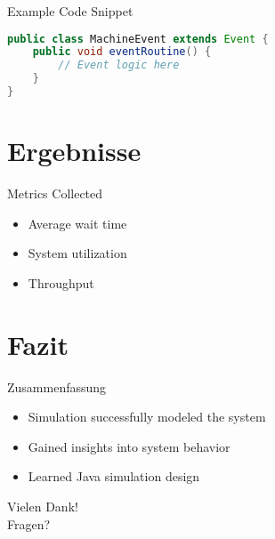\documentclass{beamer}
\begin{document}
    \begin{frame}[fragile]{Example Code Snippet}
        \begin{lstlisting}[language=Java, caption=Basic event class]
public class MachineEvent extends Event {
    public void eventRoutine() {
        // Event logic here
    }
}
        \end{lstlisting}
    \end{frame}

    \section{Ergebnisse}
    \begin{frame}{Metrics Collected}
        \begin{itemize}
            \item Average wait time
            \item System utilization
            \item Throughput
        \end{itemize}
    \end{frame}

    \section{Fazit}
    \begin{frame}{Zusammenfassung}
        \begin{itemize}
            \item Simulation successfully modeled the system
            \item Gained insights into system behavior
            \item Learned Java simulation design
        \end{itemize}
    \end{frame}

    \begin{frame}[standout]
        Vielen Dank!\\
        Fragen?
    \end{frame}
\end{document}
